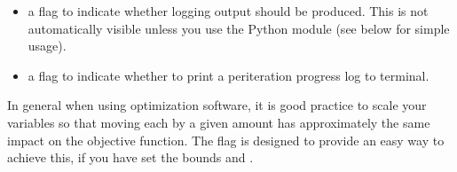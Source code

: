 \documentclass[letterpaper,10pt,english]{sphinxmanual}
\begin{document}
\begin{itemize}
\item {} 
\sphinxAtStartPar
{} \sphinxhyphen{} a flag to indicate whether logging output should be produced. This is not automatically visible unless you use the Python  module (see below for simple usage).

\item {} 
\sphinxAtStartPar
{} \sphinxhyphen{} a flag to indicate whether to print a per\sphinxhyphen{}iteration progress log to terminal.

\end{itemize}

\sphinxAtStartPar
In general when using optimization software, it is good practice to scale your variables so that moving each by a given amount has approximately the same impact on the objective function.
The  flag is designed to provide an easy way to achieve this, if you have set the bounds  and .
\end{document}
